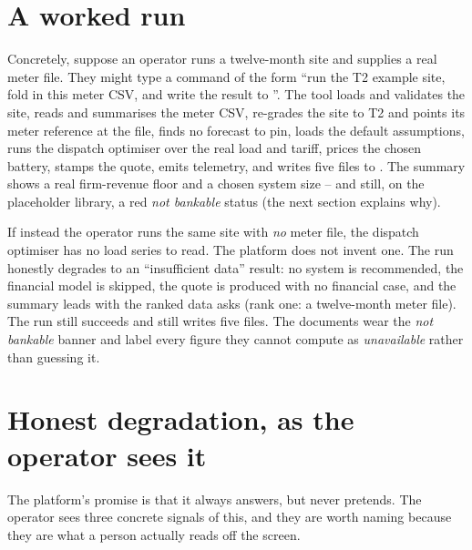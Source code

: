 \section{A worked run}

Concretely, suppose an operator runs a twelve-month site and supplies a real meter file. They might type a command of the form ``run the T2 example site, fold in this meter CSV, and write the result to ''. The tool loads and validates the site, reads and summarises the meter CSV, re-grades the site to T2 and points its meter reference at the file, finds no forecast to pin, loads the default  assumptions, runs the dispatch optimiser over the real load and tariff, prices the chosen battery, stamps the quote, emits telemetry, and writes five files to . The summary shows a real firm-revenue floor and a chosen system size -- and still, on the placeholder library, a red \emph{not bankable} status (the next section explains why).

If instead the operator runs the same site with \emph{no} meter file, the dispatch optimiser has no load series to read. The platform does not invent one. The run honestly degrades to an ``insufficient data'' result: no system is recommended, the financial model is skipped, the quote is produced with no financial case, and the summary leads with the ranked data asks (rank one: a twelve-month meter file). The run still succeeds and still writes five files. The documents wear the \emph{not bankable} banner and label every figure they cannot compute as \emph{unavailable} rather than guessing it.

\section{Honest degradation, as the operator sees it}

The platform's promise is that it always answers, but never pretends. The operator sees three concrete signals of this, and they are worth naming because they are what a person actually reads off the screen.

